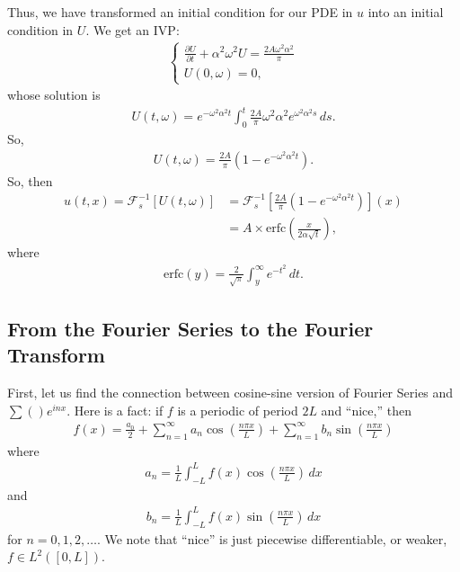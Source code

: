\documentclass{article}
\theoremstyle{definition}
\newcommand{\p}{\partial}
\newcommand{\F}{\mathcal{F}}
\begin{document}
Thus, we have transformed an initial condition for our PDE in $u$ into an initial condition in $U$. We get an IVP:
\begin{align*}
\begin{cases}
\frac{\p U}{\p t} + \alpha^2\omega^2 U = \frac{2A\omega^2\alpha^2}{\pi}\\
U(0,\omega) = 0,
\end{cases}
\end{align*}
whose solution is
\begin{align*}
U(t,\omega) = e^{-\omega^2\alpha^2t}\int^t_0\frac{2A}{\pi}\omega^2\alpha^2e^{\omega^2\alpha^2s}\,ds.
\end{align*}
So,
\begin{align*}
U(t,\omega) = \frac{2A}{\pi}\left(1 - e^{-\omega^2\alpha^2 t}\right).
\end{align*}
So, then
\begin{align*}
u(t,x) = \F_s^{-1}[U(t,\omega)] &= \F_s^{-1}\left[ \frac{2A}{\pi}\left(1 - e^{-\omega^2\alpha^2 t}\right) \right](x)\\
&= A\times \text{erfc}\left(\frac{x}{2\alpha\sqrt{t}}\right),
\end{align*}
where 
\begin{align*}
\text{erfc}(y) = \frac{2}{\sqrt{\pi}}\int^\infty_y e^{-t^2}\,dt.
\end{align*}





\subsection{From the Fourier Series to the Fourier Transform}
First, let us find the connection between cosine-sine version of Fourier Series and $\sum () e^{inx}$. Here is a fact: if $f$ is a periodic of period $2L$ and ``nice,'' then
\begin{align*}
f(x) = \frac{a_0}{2} + \sum^\infty_{n=1}a_n\cos\left(\frac{n\pi x}{L}\right) + \sum^\infty_{n=1}b_n\sin\left(\frac{n\pi x}{L}\right) 
\end{align*}
where
\begin{align*}
a_n = \frac{1}{L}\int^L_{-L}f(x)\cos\left(\frac{n\pi x}{L}\right)\,dx
\end{align*}
and
\begin{align*}
b_n = \frac{1}{L}\int^L_{-L}f(x)\sin\left(\frac{n\pi x}{L}\right)\,dx
\end{align*}
for $n=0,1,2,\dots$. We note that ``nice'' is just piecewise differentiable, or weaker, $f \in L^2([0,L])$. \\
\end{document}
